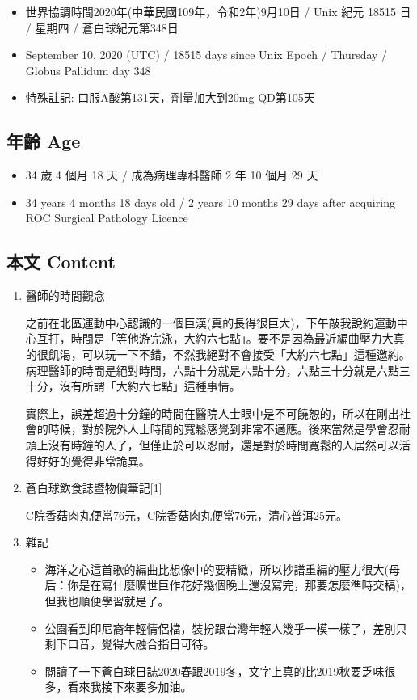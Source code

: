 \documentclass[a5paper, 11pt
]{book}
\providecommand{\tightlist}{%
  \setlength{\itemsep}{0pt}\setlength{\parskip}{0pt}}
\begin{document}
\begin{itemize}
\tightlist
\item
  世界協調時間2020年(中華民國109年，令和2年)9月10日 / Unix 紀元 18515 日
  / 星期四 / 蒼白球紀元第348日
\item
  September 10, 2020 (UTC) / 18515 days since Unix Epoch / Thursday /
  Globus Pallidum day 348
\item
  特殊註記: 口服A酸第131天，劑量加大到20mg QD第105天
\end{itemize}

\hypertarget{ux5e74ux9f61-age-9}{%
\subsection{年齡 Age}\label{ux5e74ux9f61-age-9}}

\begin{itemize}
\tightlist
\item
  34 歲 4 個月 18 天 / 成為病理專科醫師 2 年 10 個月 29 天
\item
  34 years 4 months 18 days old / 2 years 10 months 29 days after
  acquiring ROC Surgical Pathology Licence
\end{itemize}

\hypertarget{ux672cux6587-content-9}{%
\subsection{本文 Content}\label{ux672cux6587-content-9}}

\begin{enumerate}
\def\labelenumi{\arabic{enumi}.}
\item
  醫師的時間觀念

  之前在北區運動中心認識的一個巨漢(真的長得很巨大)，下午敲我說約運動中心互打，時間是「等他游完泳，大約六七點」。要不是因為最近編曲壓力大真的很飢渴，可以玩一下不錯，不然我絕對不會接受「大約六七點」這種邀約。病理醫師的時間是絕對時間，六點十分就是六點十分，六點三十分就是六點三十分，沒有所謂「大約六七點」這種事情。

  實際上，誤差超過十分鐘的時間在醫院人士眼中是不可饒恕的，所以在剛出社會的時候，對於院外人士時間的寬鬆感覺到非常不適應。後來當然是學會忍耐頭上沒有時鐘的人了，但僅止於可以忍耐，還是對於時間寬鬆的人居然可以活得好好的覺得非常詭異。
\item
  蒼白球飲食誌暨物價筆記{[}1{]}

  C院香菇肉丸便當76元，C院香菇肉丸便當76元，清心普洱25元。
\item
  雜記

  \begin{itemize}
  \tightlist
  \item
    海洋之心這首歌的編曲比想像中的要精緻，所以抄譜重編的壓力很大(母后：你是在寫什麼曠世巨作花好幾個晚上還沒寫完，那要怎麼準時交稿)，但我也順便學習就是了。
  \item
    公園看到印尼裔年輕情侶檔，裝扮跟台灣年輕人幾乎一模一樣了，差別只剩下口音，覺得大融合指日可待。
  \item
    閱讀了一下蒼白球日誌2020春跟2019冬，文字上真的比2019秋要乏味很多，看來我接下來要多加油。
  \end{itemize}
\end{enumerate}
\end{document}

